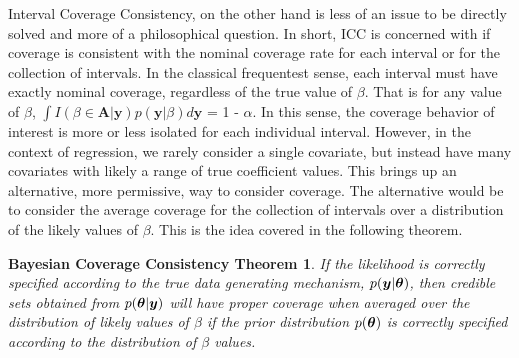 Interval Coverage Consistency, on the other hand is less of an issue to be directly solved and more of a philosophical question. In short, ICC is concerned with if coverage is consistent with the nominal coverage rate for each interval or for the collection of intervals. In the classical frequentest sense, each interval must have exactly nominal coverage, regardless of the true value of $\beta$. That is for any value of $\beta$, $\int I(\beta \in \boldsymbol{A} | \boldsymbol{y}) p(\boldsymbol{y} | \beta)d\boldsymbol{y}$ = 1 - $\alpha$. In this sense, the coverage behavior of interest is more or less isolated for each individual interval. However, in the context of regression, we rarely consider a single covariate, but instead have many covariates with likely a range of true coefficient values. This brings up an alternative, more permissive, way to consider coverage. The alternative would be to consider the average coverage for the collection of intervals over a distribution of the likely values of $\beta$. This is the idea covered in the following theorem. 
\newtheorem*{coverage}{Bayesian Coverage Consistency Theorem\label{Thm:BCC}}

\begin{coverage}
If the likelihood is correctly specified according to the true data generating mechanism, $p(\boldsymbol{y} | \boldsymbol{\theta})$, then credible sets obtained from $p(\boldsymbol{\theta}|\boldsymbol{y})$ will have proper coverage when averaged over the distribution of likely values of $\beta$ if the prior distribution $p(\boldsymbol{\theta})$ is correctly specified according to the distribution of $\beta$ values.
\end{coverage}

